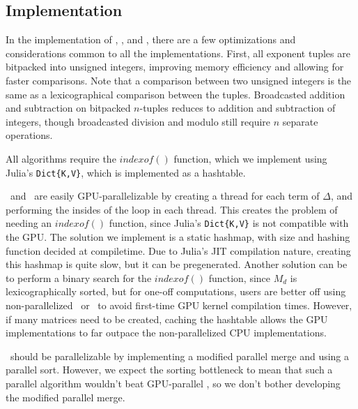 \subsection{Implementation}

In the implementation of \triv, \merge, and \wics, there are a few optimizations and considerations common to all the implementations.
First, all exponent tuples are bitpacked into unsigned integers, improving memory efficiency and allowing for faster comparisons.
Note that a comparison between two unsigned integers is the same as a lexicographical comparison between the tuples.
Broadcasted addition and subtraction on bitpacked $n$-tuples reduces to addition and subtraction of integers, though broadcasted division and modulo still require $n$ separate operations.

All algorithms require the $indexof()$ function, which we implement using Julia's \texttt{Dict\{K,V\}}, which is implemented as a hashtable.

\triv ~and \wics ~are easily GPU-parallelizable by creating a thread for each term of $\Delta$, and performing the insides of the loop in each thread.
This creates the problem of needing an $indexof()$ function, since Julia's \texttt{Dict\{K,V\}} is not compatible with the GPU.
The solution we implement is a static hashmap, with size and hashing function decided at compiletime.
Due to Julia's JIT compilation nature, creating this hashmap is quite slow, but it can be pregenerated.
Another solution can be to perform a binary search for the $indexof()$ function, since $M_d$ is lexicographically sorted, but for one-off computations, users are better off using non-parallelized \merge ~or \wics ~to avoid first-time GPU kernel compilation times.
However, if many matrices need to be created, caching the hashtable allows the GPU implementations to far outpace the non-parallelized CPU implementations.

\merge ~should be parallelizable by implementing a modified parallel merge and using a parallel sort. 
However, we expect the sorting bottleneck to mean that such a parallel algorithm wouldn't beat GPU-parallel \wics,
so we don't bother developing the modified parallel merge.
